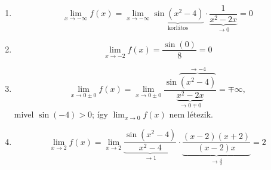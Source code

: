 \documentclass[11pt]{scrartcl}
\begin{document}
\begin{enumerate}
	\item \[
		      \lim_{x \to -\infty} f(x)
		      = \lim_{x \to -\infty}
		      \underbrace{\sin\left(x^2 - 4\right)}_{\text{korlátos}} \cdot
		      \underbrace{\frac{1}{x^2 - 2x}}_{\to 0}
		      = 0
	      \]

	\item \[
		      \lim_{x \to -2} f(x) = \frac{\sin(0)}{8} = 0
	      \]

	\item \[
		      \lim_{x \to 0 \pm 0} f(x)
		      = \lim_{x \to 0 \pm 0}
		      \frac{\sin \overbrace{\left(x^2 - 4\right)}^{\to -4}}{\underbrace{x^2 - 2x}_{\to 0 \mp 0}}
		      = \mp \infty,
	      \]
	      mivel $\sin(-4) > 0$; így $\lim_{x \to 0} f(x)$ nem létezik.

	\item \[
		      \lim_{x \to 2} f(x)
		      = \lim_{x \to 2}
		      \underbrace{\frac{\sin\left(x^2 - 4\right)}{x^2 - 4}}_{\to 1} \cdot
		      \underbrace{\frac{(x - 2)(x + 2)}{(x - 2) x}}_{\to \frac{4}{2}}
		      = 2
	      \]
\end{enumerate}
\end{document}
